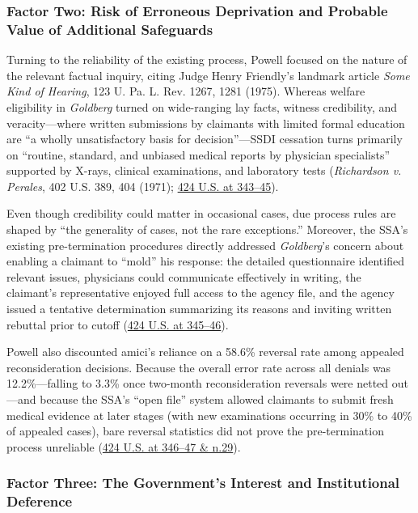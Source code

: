 \documentclass[12pt]{article}
\begin{document}
\subsubsection{Factor Two: Risk of Erroneous Deprivation and Probable Value of Additional Safeguards}

Turning to the reliability of the existing process, Powell focused on the nature of the relevant factual inquiry, citing Judge Henry Friendly's landmark article \emph{Some Kind of Hearing}, 123 U. Pa. L. Rev. 1267, 1281 (1975). Whereas welfare eligibility in \emph{Goldberg} turned on wide-ranging lay facts, witness credibility, and veracity---where written submissions by claimants with limited formal education are ``a wholly unsatisfactory basis for decision''---SSDI cessation turns primarily on ``routine, standard, and unbiased medical reports by physician specialists'' supported by X-rays, clinical examinations, and laboratory tests (\emph{Richardson v. Perales}, 402 U.S. 389, 404 (1971); \href{https://supreme.justia.com/cases/federal/us/424/319/}{424 U.S. at 343--45}).

Even though credibility could matter in occasional cases, due process rules are shaped by ``the generality of cases, not the rare exceptions.'' Moreover, the SSA's existing pre-termination procedures directly addressed \emph{Goldberg}'s concern about enabling a claimant to ``mold'' his response: the detailed questionnaire identified relevant issues, physicians could communicate effectively in writing, the claimant's representative enjoyed full access to the agency file, and the agency issued a tentative determination summarizing its reasons and inviting written rebuttal prior to cutoff (\href{https://supreme.justia.com/cases/federal/us/424/319/}{424 U.S. at 345--46}).

Powell also discounted amici's reliance on a 58.6\% reversal rate among appealed reconsideration decisions. Because the overall error rate across all denials was 12.2\%---falling to 3.3\% once two-month reconsideration reversals were netted out---and because the SSA's ``open file'' system allowed claimants to submit fresh medical evidence at later stages (with new examinations occurring in 30\% to 40\% of appealed cases), bare reversal statistics did not prove the pre-termination process unreliable (\href{https://supreme.justia.com/cases/federal/us/424/319/}{424 U.S. at 346--47 \& n.29}).

\subsubsection{Factor Three: The Government's Interest and Institutional Deference}
\end{document}

